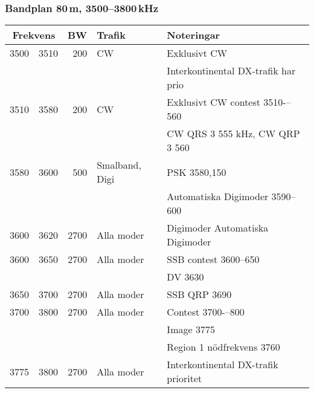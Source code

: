 \subsubsection{Bandplan 80\,m, 3500--3800\,kHz}
\begin{tabular}{rrrll}
\multicolumn{2}{c}{\textbf{Frekvens}} & \textbf{BW} & \textbf{Trafik} & \textbf{Noteringar} \\ \hline
3500 & 3510 & 200  & CW             & Exklusivt CW                         \\ 
      &       &      &                & Interkontinental DX-trafik har prio  \\ \hline
3510 & 3580 & 200  & CW             & Exklusivt CW contest 3510-–560       \\ 
      &       &      &                & CW QRS 3 555 kHz, CW QRP 3 560       \\ \hline
3580 & 3600 & 500  & Smalband, Digi & PSK 3580,150                        \\
      &       &      &                & Automatiska Digimoder 3590--600     \\ \hline
3600 & 3620 & 2700 & Alla moder     & Digimoder Automatiska Digimoder      \\ \hline
3600 & 3650 & 2700 & Alla moder     & SSB contest 3600--650               \\
      &       &      &                & DV 3630                             \\ \hline
3650 & 3700 & 2700 & Alla moder     & SSB QRP 3690                        \\ \hline
3700 & 3800 & 2700 & Alla moder     & Contest 3700-–800                   \\
      &       &      &                & Image 3775                          \\
      &       &      &                & Region 1 nödfrekvens 3760           \\ \hline
3775 & 3800 & 2700 & Alla moder     & Interkontinental DX-trafik prioritet \\ \hline
\end{tabular}

